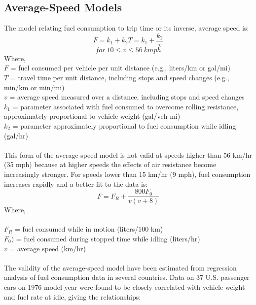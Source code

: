 \subsection{Average-Speed Models}
The model relating fuel consumption to trip time or its inverse, average speed is:
\begin{equation}
	F = k_1 + k_2 T = k_1 + \frac{k_2}{v}
\end{equation}
$$ for\: 10 \leq v \leq 56\:kmph $$
Where,\\
\hspace*{10mm} $ F $ = fuel consumed per vehicle per unit distance (e.g., liters/km or gal/mi)\\
\hspace*{10mm} $ T $ = travel time per unit distance, including stops and speed changes (e.g., min/km or min/mi)\\
\hspace*{10mm} $ v $ = average speed measured over a distance, including stops and speed changes\\
\hspace*{10mm} $ k_1 $ = parameter associated with fuel consumed to overcome rolling resistance, approximately proportional to vehicle weight (gal/veh-mi)\\
\hspace*{10mm} $ k_2 $ = parameter approximately proportional to fuel consumption while idling (gal/hr)\\\\
This form of the average speed model is not valid at speeds higher than 56 km/hr (35 mph) because at higher speeds the effects of air resistance become increasingly stronger. For speeds lower than 15 km/hr (9 mph), fuel consumption increases rapidly and a better fit to the data is:
\begin{equation}
	F = F_R + \frac{800 F_0}{v (v + 8)}
\end{equation}
Where,\\\\
\hspace*{10mm} $ F_R $ = fuel consumed while in motion (liters/100 km)\\
\hspace*{10mm} $ F_0) $ = fuel consumed during stopped time while idling (liters/hr)\\
\hspace*{10mm} $ v $ = average speed (km/hr)\\\\
The validity of the average-speed model have been estimated from regression analysis of fuel consumption data in several countries. Data on 37 U.S. passenger cars on 1976 model year were found to be closely correlated with vehicle weight and fuel rate at idle, giving the relationships:
